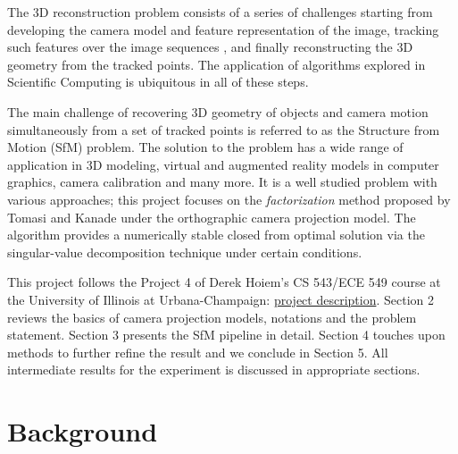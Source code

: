 The 3D reconstruction problem consists of a series of challenges starting from developing the
camera model and feature representation of the image,
tracking such features over the image sequences , and finally
reconstructing the 3D geometry from the tracked points. The application of algorithms explored in
Scientific Computing is ubiquitous in all of these steps. 

The main challenge of recovering 3D geometry of objects and camera
motion simultaneously from a set of tracked points is referred to as the Structure from Motion (SfM) problem. The solution to the problem has a
wide range of application in 3D modeling, virtual and augmented
reality models in computer graphics, camera calibration and many
more. It is a well studied problem with various approaches; this project focuses on the \emph{factorization} method proposed by Tomasi and Kanade
\cite{Tomasi} under the orthographic camera projection model. The
algorithm provides a numerically stable closed from optimal solution
via the singular-value decomposition technique under certain
conditions. \cite[p. 435]{AZ}

This project follows the Project 4 of Derek Hoiem's CS 543/ECE 549
course at the University of Illinois at Urbana-Champaign:
\href{http://www.cs.illinois.edu/class/sp11/cs543/hw/hw4.pdf}{project
  description}. Section 2 reviews the basics of camera projection
models, notations and the problem statement. Section 3 presents the
SfM pipeline in detail. Section 4 touches upon methods to further
refine the result and we conclude in Section 5. All intermediate
results for the experiment is discussed in appropriate sections.

\section{Background}

